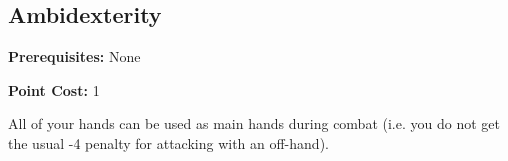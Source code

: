 \subsection{Ambidexterity}\label{feat:ambidexterity}

\noindent
\textbf{Prerequisites:} None

\noindent
\textbf{Point Cost:} 1 

All of your hands can be used as main hands during combat (i.e. you do not
get the usual -4 penalty for attacking with an off-hand).
